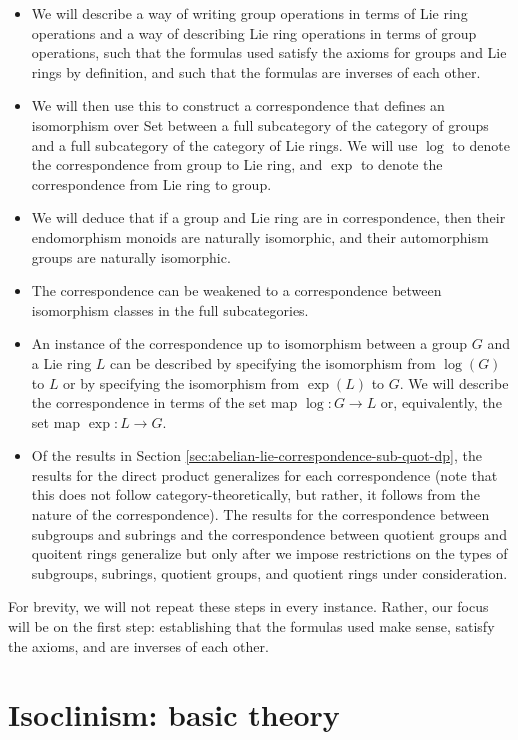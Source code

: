 \documentclass{ucetd}
\begin{document}
\begin{itemize}
\item We will describe a way of writing group operations in terms of
  Lie ring operations and a way of describing Lie ring operations in
  terms of group operations, such that the formulas used satisfy the
  axioms for groups and Lie rings by definition, and such that the
  formulas are inverses of each other.
\item We will then use this to construct a correspondence that defines
  an isomorphism over Set between a full subcategory of the category
  of groups and a full subcategory of the category of Lie rings. We
  will use $\log$ to denote the correspondence from group to Lie ring,
  and $\exp$ to denote the correspondence from Lie ring to group.
\item We will deduce that if a group and Lie ring are in
  correspondence, then their endomorphism monoids are naturally
  isomorphic, and their automorphism groups are naturally isomorphic.
\item The correspondence can be weakened to a correspondence between
  isomorphism classes in the full subcategories.
\item An instance of the correspondence up to isomorphism between a
  group $G$ and a Lie ring $L$ can be described by specifying the
  isomorphism from $\log(G)$ to $L$ or by specifying the isomorphism
  from $\exp(L)$ to $G$. We will describe the correspondence in terms
  of the set map $\log:G \to L$ or, equivalently, the set map $\exp:L
  \to G$.
\item Of the results in Section
  \ref{sec:abelian-lie-correspondence-sub-quot-dp}, the results for
  the direct product generalizes for each correspondence (note that
  this does not follow category-theoretically, but rather, it follows
  from the nature of the correspondence). The results for the
  correspondence between subgroups and subrings and the correspondence
  between quotient groups and quoitent rings generalize but only after
  we impose restrictions on the types of subgroups, subrings, quotient
  groups, and quotient rings under consideration.
\end{itemize}

For brevity, we will not repeat these steps in every instance. Rather,
our focus will be on the first step: establishing that the formulas
used make sense, satisfy the axioms, and are inverses of each other.

\chapter{Isoclinism: basic theory}
\end{document}
